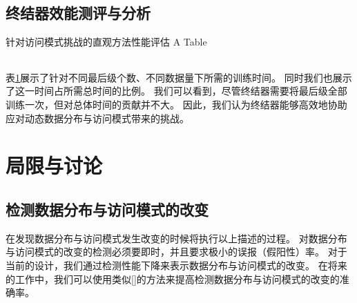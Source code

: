 \subsection{终结器效能测评与分析}

\begin{table}[!hpb]
  \centering
  \bicaption[指向一个表格的表目录索引]
    {针对访问模式挑战的直观方法性能评估}
    {A Table}
  \label{tab:finalizer}
  \begin{tabular}{@{}llr@{}} \toprule
  \end{tabular}
\end{table}

表\ref{tab:finalizer}展示了针对不同{\rmi}最后级{\model}个数、不同数据量下所需的训练时间。
同时我们也展示了这一时间占{\sys}所需总时间的比例。
我们可以看到，尽管终结器需要将{\rmi}最后级{\model}全部训练一次，但对总体时间的贡献并不大。
因此，我们认为终结器能够高效地协助{\sys}应对动态数据分布与访问模式带来的挑战。

\section{局限与讨论}

\subsection{检测数据分布与访问模式的改变}

{\sys}在发现数据分布与访问模式发生改变的时候将执行以上描述的过程。
对数据分布与访问模式的改变的检测必须要即时，并且要求极小的误报（假阳性）率。
对于当前的设计，我们通过检测性能下降来表示数据分布与访问模式的改变。
在将来的工作中，我们可以使用类似[]的方法来提高检测数据分布与访问模式的改变的准确率。


